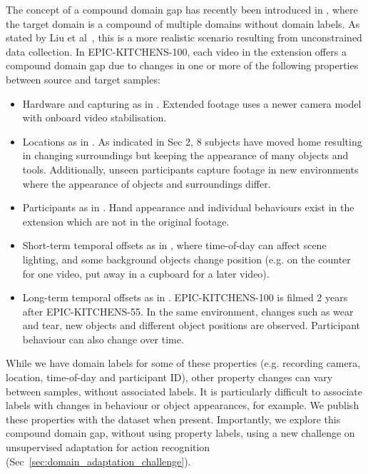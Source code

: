 \RequirePackage{amsmath} \documentclass[runningheads]{llncs}
\newcommand {\oldDataset} {EPIC-KITCHENS-55{}}
\newcommand {\newDataset} {EPIC-KITCHENS-100}
\begin{document}
The concept of a compound domain gap has recently been introduced in \cite{Liu2020}, where the target domain is a compound of multiple domains without domain labels. As stated by Liu et al~\cite{Liu2020}, this is a more realistic scenario resulting from unconstrained data collection. In \newDataset{}, each video in the extension offers a compound domain gap due to changes in one or more of the following properties between source and target samples:
\begin{itemize}[leftmargin=*,itemsep=-2ex,partopsep=1ex,parsep=2ex]
    \item Hardware and capturing as in \cite{Saenko2010a,Gong2012}.  Extended footage uses a newer camera model with onboard video stabilisation.
    \item Locations as in \cite{Oberdiek2020}.  As indicated in Sec 2, 8 subjects have moved home resulting in changing surroundings but keeping the appearance of many objects and tools. Additionally, unseen participants capture footage in new environments where the appearance of objects and surroundings differ.
    \item Participants as in \cite{Stein}.  Hand appearance and individual behaviours exist in the extension which are not in the original footage.
    \item Short-term temporal offsets as in \cite{Wulfmeier2018}, where time-of-day can affect scene lighting, and some background objects change position (e.g. on the counter for one video, put away in a cupboard for a later video).
    \item Long-term temporal offsets as in \cite{Carlevaris-Bianco2016,Maddern2017}.  \newDataset{} is filmed 2 years after \oldDataset{}.  In the same environment, changes such as wear and tear, new objects and different object positions are observed.  Participant behaviour can also change over time.
\end{itemize}

While we have domain labels for some of these properties (e.g. recording camera, location, time-of-day and participant ID), other property changes can vary between samples, without associated labels.
It is particularly difficult to associate labels with changes in behaviour or object appearances, for example.
We publish these properties with the dataset when present.
Importantly, we explore this compound domain gap, without using property labels, using a new challenge on unsupervised adaptation for action recognition (Sec~\ref{sec:domain_adaptation_challenge}).
\end{document}
